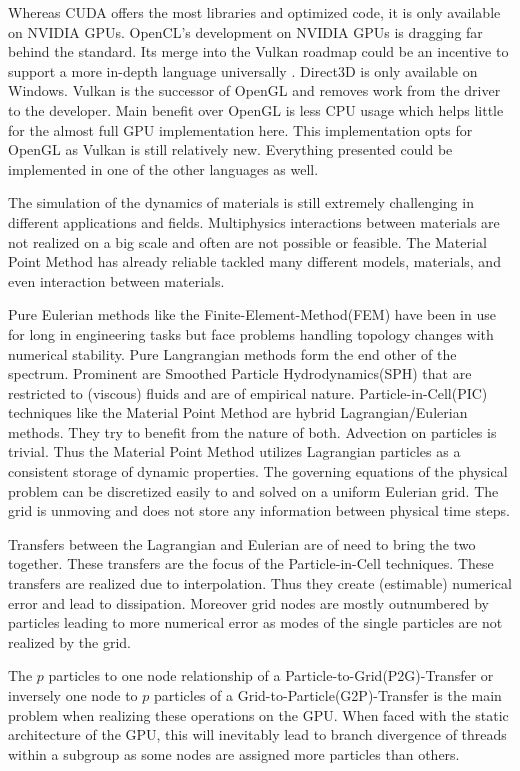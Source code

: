 \documentclass[m,times]{cgMA}
\begin{document}
Whereas CUDA offers the most libraries and optimized code, it is only available on NVIDIA GPUs. OpenCL's development on NVIDIA GPUs is dragging far behind the standard. Its merge into the Vulkan roadmap could be an incentive to support a more in-depth language universally \cite{OPENCL:ROADMAP}. Direct3D is only available on Windows. Vulkan is the successor of OpenGL and removes work from the driver to the developer. Main benefit over OpenGL is less CPU usage which helps little for the almost full GPU implementation here. This implementation opts for OpenGL as Vulkan is still relatively new. Everything presented could be implemented in one of the other languages as well.

The simulation of the dynamics of materials is still extremely challenging in different applications and fields. Multiphysics interactions between materials are not realized on a big scale and often are not possible or feasible. The Material Point Method has already reliable tackled many different models, materials, and even interaction between materials.

Pure Eulerian methods like the Finite-Element-Method(FEM) have been in use for long in engineering tasks but face problems handling topology changes with numerical stability. Pure Langrangian methods form the end other of the spectrum. Prominent are Smoothed Particle Hydrodynamics(SPH) that are restricted to (viscous) fluids and are of empirical nature. Particle-in-Cell(PIC) techniques like the Material Point Method are hybrid Lagrangian/Eulerian methods. They try to benefit from the nature of both. Advection on particles is trivial. Thus the Material Point Method utilizes Lagrangian particles as a consistent storage of dynamic properties. The governing equations of the physical problem can be discretized easily to and solved on a uniform Eulerian grid. The grid is unmoving and does not store any information between physical time steps.

Transfers between the Lagrangian and Eulerian are of need to bring the two together. These transfers are the focus of the Particle-in-Cell techniques. These transfers are realized due to interpolation. Thus they create (estimable) numerical error and lead to dissipation. Moreover grid nodes are mostly outnumbered by particles leading to more numerical error as modes of the single particles are not realized by the grid.

The $p$ particles to one node relationship of a Particle-to-Grid(P2G)-Transfer or inversely one node to $p$ particles of a Grid-to-Particle(G2P)-Transfer is the main problem when realizing these operations on the GPU. When faced with the static architecture of the GPU, this will inevitably lead to branch divergence of threads within a subgroup as some nodes are assigned more particles than others.
\end{document}
